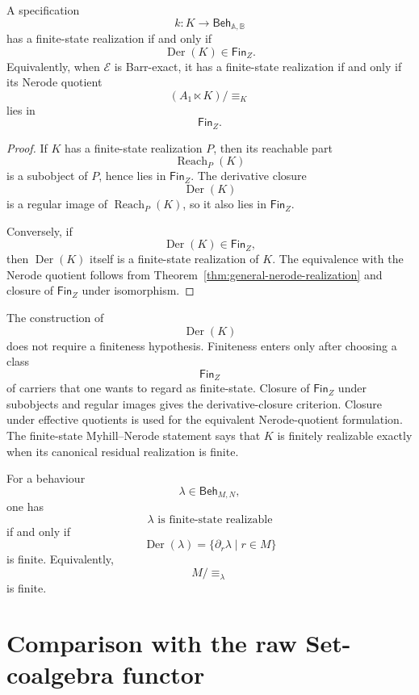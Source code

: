 \begin{corollary}
\label{cor:finite-state-myhill-nerode}
A specification
\[
k:K\to\mathsf{Beh}_{\mathbb A,\mathbb B}
\]
has a finite-state realization if and only if
\[
\operatorname{Der}(K)\in\mathsf{Fin}_Z.
\]
Equivalently, when \(\mathcal E\) is Barr-exact, it has a finite-state
realization if and only if its Nerode quotient
\[
(A_1\ltimes K)/{\equiv_K}
\]
lies in
\[
\mathsf{Fin}_Z.
\]
\end{corollary}

\begin{proof}
If \(K\) has a finite-state realization \(P\), then its reachable part
\[
\operatorname{Reach}_P(K)
\]
is a subobject of \(P\), hence lies in \(\mathsf{Fin}_Z\). The derivative
closure
\[
\operatorname{Der}(K)
\]
is a regular image of \(\operatorname{Reach}_P(K)\), so it also lies in
\(\mathsf{Fin}_Z\).

Conversely, if
\[
\operatorname{Der}(K)\in\mathsf{Fin}_Z,
\]
then \(\operatorname{Der}(K)\) itself is a finite-state realization of \(K\).
The equivalence with the Nerode quotient follows from
Theorem~\ref{thm:general-nerode-realization} and closure of \(\mathsf{Fin}_Z\)
under isomorphism.
\end{proof}

\begin{remark}
\label{rem:finiteness-external-to-construction}
The construction of
\[
\operatorname{Der}(K)
\]
does not require a finiteness hypothesis. Finiteness enters only after
choosing a class
\[
\mathsf{Fin}_Z
\]
of carriers that one wants to regard as finite-state. Closure of
\(\mathsf{Fin}_Z\) under subobjects and regular images gives the
derivative-closure criterion. Closure under effective quotients is used for
the equivalent Nerode-quotient formulation. The finite-state Myhill--Nerode
statement says that \(K\) is finitely realizable exactly when its canonical
residual realization is finite.
\end{remark}

\begin{example}
\label{ex:finite-state-monoid-case}
For a behaviour
\[
\lambda\in\mathsf{Beh}_{M,N},
\]
one has
\[
\lambda
\text{ is finite-state realizable}
\]
if and only if
\[
\operatorname{Der}(\lambda)
=
\{\partial_r\lambda\mid r\in M\}
\]
is finite. Equivalently,
\[
M/{\equiv_\lambda}
\]
is finite.
\end{example}

\section{Comparison with the raw Set-coalgebra functor}
\label{sec:comparison-raw-set-mealy-functor}

